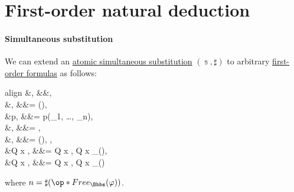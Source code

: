\section{First-order natural deduction}\label{sec:first_order_natural_deduction}

\paragraph{Simultaneous substitution}

\begin{algorithm}\label{alg:fol_formula_substitution}\mimprovised
  We can extend an \hyperref[def:atomic_lambda_term_substitution]{atomic simultaneous substitution} \( (\Bbbs, \sharp) \) to arbitrary \hyperref[def:fol_formula]{first-order formulas} as follows:
  \begin{empheq}[left={\varphi[\Bbbs]} \coloneqq \empheqlbrace]{align}
    &\varphi,                                                    &&\varphi \in {},                                                                      \label{eq:alg:fol_formula_substitution/const}         \\
    &\tau[\Bbbs] \syneq \sigma[\Bbbs],                           &&\varphi = (\tau \syneq \sigma),                                                                \label{eq:alg:fol_formula_substitution/eq} \\
    &p, &&\varphi = p(\sigma_1, \ldots, \sigma_n),                                                       \label{eq:alg:fol_formula_substitution/pred} \\
    &\synneg \psi[\Bbbs],                                        &&\varphi = \synneg \psi,                                                                        \label{eq:alg:fol_formula_substitution/neg} \\
    &\psi[\Bbbs] \syncirc \theta[\Bbbs],                         &&\varphi = (\psi \syncirc \theta), {\syncirc} \in {},                                   \label{eq:alg:fol_formula_substitution/conn} \\
    &\quantifier Q x ,                  &&\varphi = \quantifier Q x \psi, Q \in {}  x \notin {}_\Bbbs(\varphi), \label{eq:alg:fol_formula_substitution/quant/direct} \\
    &\quantifier Q x ,                  &&\varphi = \quantifier Q x \psi, Q \in {}  x \in {}_\Bbbs(\varphi)      \label{eq:alg:fol_formula_substitution/quant/renaming}
  \end{empheq}
  where \( n = \sharp(\op*{Free}_\Bbbs(\varphi)) \).
\end{algorithm}
